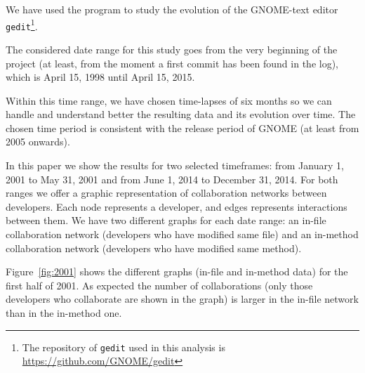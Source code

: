 \documentclass[a4paper]{article}
\begin{document}
We have used the program to study the evolution of the GNOME-text editor \texttt{gedit}\footnote{The repository of \texttt{gedit} used in this analysis is \url{https://github.com/GNOME/gedit}}.

The considered date range for this study goes from the very beginning of
the project (at least, from the moment a first commit has been found in the log), which is April
15, 1998 until April 15, 2015.

Within this time range, we have chosen time-lapses of six months so
we can handle and understand better the resulting data and its evolution
over time. The chosen time period is consistent with the release period of GNOME 
(at least from 2005 onwards).

In this paper we show the results for two selected timeframes: from January 1, 2001 to May 31, 2001 and from June 1, 2014 to December 31, 2014. For both ranges we offer a graphic representation of collaboration networks between
developers. Each node represents a developer, and edges represents
interactions between them. We have two different graphs for each date range: an in-file collaboration network (developers who have modified same file) and an in-method
collaboration network (developers who have modified same method).

Figure~\ref{fig:2001} shows the different graphs (in-file and in-method data) for the
first half of 2001. As expected the number of collaborations (only those developers
who collaborate are shown in the graph) is larger in the in-file network than in
the in-method one.
\end{document}
